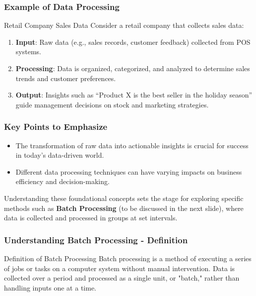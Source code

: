 \documentclass{beamer}
\begin{document}
\begin{frame}[fragile]
    \frametitle{Example of Data Processing}
    \begin{block}{Retail Company Sales Data}
        Consider a retail company that collects sales data:
        \begin{enumerate}
            \item \textbf{Input}: Raw data (e.g., sales records, customer feedback) collected from POS systems.
            \item \textbf{Processing}: Data is organized, categorized, and analyzed to determine sales trends and customer preferences.
            \item \textbf{Output}: Insights such as “Product X is the best seller in the holiday season” guide management decisions on stock and marketing strategies.
        \end{enumerate}
    \end{block}
\end{frame}

\begin{frame}[fragile]
    \frametitle{Key Points to Emphasize}
    \begin{itemize}
        \item The transformation of raw data into actionable insights is crucial for success in today’s data-driven world.
        \item Different data processing techniques can have varying impacts on business efficiency and decision-making.
    \end{itemize}
    
    Understanding these foundational concepts sets the stage for exploring specific methods such as \textbf{Batch Processing} (to be discussed in the next slide), where data is collected and processed in groups at set intervals.
\end{frame}

\begin{frame}[fragile]
    \frametitle{Understanding Batch Processing - Definition}
    \begin{block}{Definition of Batch Processing}
        Batch processing is a method of executing a series of jobs or tasks on a computer system without manual intervention. 
        Data is collected over a period and processed as a single unit, or "batch," rather than handling inputs one at a time.
    \end{block}
\end{frame}
\end{document}
